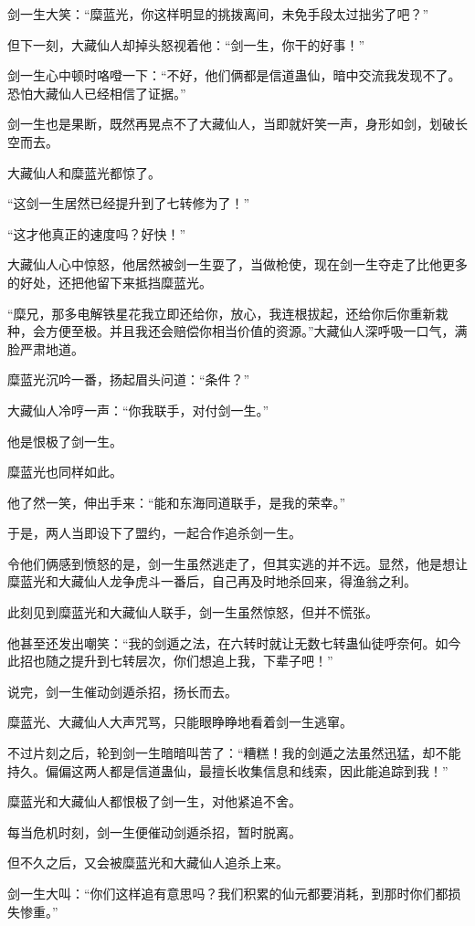 \begin{this_body}
剑一生大笑：“糜蓝光，你这样明显的挑拨离间，未免手段太过拙劣了吧？”

但下一刻，大藏仙人却掉头怒视着他：“剑一生，你干的好事！”

剑一生心中顿时咯噔一下：“不好，他们俩都是信道蛊仙，暗中交流我发现不了。恐怕大藏仙人已经相信了证据。”

剑一生也是果断，既然再晃点不了大藏仙人，当即就奸笑一声，身形如剑，划破长空而去。

大藏仙人和糜蓝光都惊了。

“这剑一生居然已经提升到了七转修为了！”

“这才他真正的速度吗？好快！”

大藏仙人心中惊怒，他居然被剑一生耍了，当做枪使，现在剑一生夺走了比他更多的好处，还把他留下来抵挡糜蓝光。

“糜兄，那多电解铁星花我立即还给你，放心，我连根拔起，还给你后你重新栽种，会方便至极。并且我还会赔偿你相当价值的资源。”大藏仙人深呼吸一口气，满脸严肃地道。

糜蓝光沉吟一番，扬起眉头问道：“条件？”

大藏仙人冷哼一声：“你我联手，对付剑一生。”

他是恨极了剑一生。

糜蓝光也同样如此。

他了然一笑，伸出手来：“能和东海同道联手，是我的荣幸。”

于是，两人当即设下了盟约，一起合作追杀剑一生。

令他们俩感到愤怒的是，剑一生虽然逃走了，但其实逃的并不远。显然，他是想让糜蓝光和大藏仙人龙争虎斗一番后，自己再及时地杀回来，得渔翁之利。

此刻见到糜蓝光和大藏仙人联手，剑一生虽然惊怒，但并不慌张。

他甚至还发出嘲笑：“我的剑遁之法，在六转时就让无数七转蛊仙徒呼奈何。如今此招也随之提升到七转层次，你们想追上我，下辈子吧！”

说完，剑一生催动剑遁杀招，扬长而去。

糜蓝光、大藏仙人大声咒骂，只能眼睁睁地看着剑一生逃窜。

不过片刻之后，轮到剑一生暗暗叫苦了：“糟糕！我的剑遁之法虽然迅猛，却不能持久。偏偏这两人都是信道蛊仙，最擅长收集信息和线索，因此能追踪到我！”

糜蓝光和大藏仙人都恨极了剑一生，对他紧追不舍。

每当危机时刻，剑一生便催动剑遁杀招，暂时脱离。

但不久之后，又会被糜蓝光和大藏仙人追杀上来。

剑一生大叫：“你们这样追有意思吗？我们积累的仙元都要消耗，到那时你们都损失惨重。”


\end{this_body}

